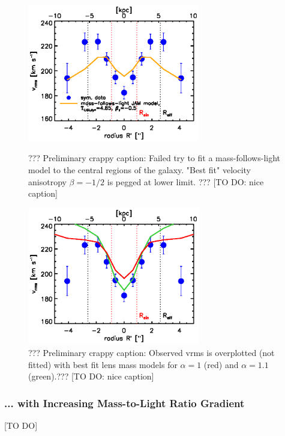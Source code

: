 \documentclass[useAMS,usenatbib]{mn2e}
\begin{document}
\begin{figure}
\centering
\begin{minipage}{.5\textwidth}
  \centering
  \includegraphics[height=6cm]{fig/jam_A2_vrms.ps}
  \caption{??? Preliminary crappy caption: Failed try to fit a mass-follows-light model to the central regions of the galaxy. "Best fit" velocity anisotropy $\beta = -1/2$ is pegged at lower limit. ??? [TO DO: nice caption]}
  \label{fig:???}
\end{minipage}%
\begin{minipage}{.5\textwidth}
  \centering
  \includegraphics[height=6cm]{fig/lensing_JAM_comparision.ps}
  \caption{??? Preliminary crappy caption: Observed vrms is overplotted (not fitted) with best fit lens mass models for $\alpha = 1$ (red) and $\alpha = 1.1$ (green).??? [TO DO: nice caption]}
  \label{fig:???}
\end{minipage}
\end{figure}

\subsubsection{... with Increasing Mass-to-Light Ratio Gradient}

[TO DO]
\end{document}

